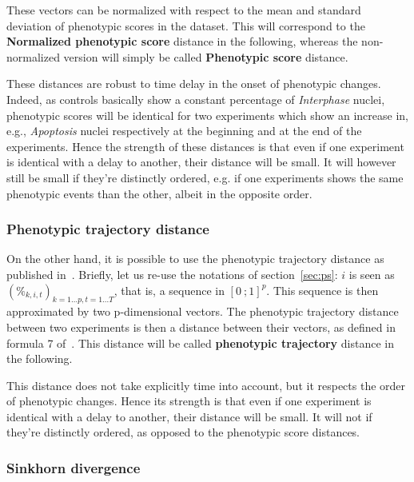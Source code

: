 These vectors can be normalized with respect to the mean and standard deviation of phenotypic scores in the dataset. This will correspond to the \textbf{Normalized phenotypic score} distance in the following, whereas the non-normalized version will simply be called \textbf{Phenotypic score} distance.

These distances are robust to time delay in the onset of phenotypic changes. Indeed, as controls basically show a constant percentage of \textit{Interphase} nuclei, phenotypic scores will be identical for two experiments which show an increase in, e.g., \textit{Apoptosis} nuclei respectively at the beginning and at the end of the experiments. Hence the strength of these distances is that even if one experiment is identical with a delay to another, their distance will be small. It will however still be small if they're distinctly ordered, e.g. if one experiments shows the same phenotypic events than the other, albeit in the opposite order.

\subsubsection{Phenotypic trajectory distance}
On the other hand, it is possible to use the phenotypic trajectory distance as published in~\cite{Walter2010}. Briefly, let us re-use the notations of section~\ref{sec:ps}: $i$ is seen as $(\%_{k,i,t})_{k=1\ldots p,t=1\ldots T}$, that is, a sequence in $[0~;1]^p$. This sequence is then approximated by two p-dimensional vectors. The phenotypic trajectory distance between two experiments is then a distance between their vectors, as defined in formula 7 of~\cite{Walter2010}. This distance will be called \textbf{phenotypic trajectory} distance in the following.

This distance does not take explicitly time into account, but it respects the order of phenotypic changes. Hence its strength is that even if one experiment is identical with a delay to another, their distance will be small. It will not if they're distinctly ordered, as opposed to the phenotypic score distances.

\subsubsection{Sinkhorn divergence}
